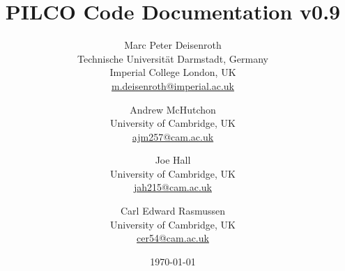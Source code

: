 \newcommand{\te}[1]{\text{#1}}
\newcommand{\dpp}{\mathrm{\partial}}
\newcommand{\pdiff}[2]{\frac{\dpp #1}{\dpp #2}}

\setcounter{secnumdepth}{3}

\title{\bf PILCO Code Documentation v0.9} 

\author{Marc Peter Deisenroth\\
Technische Universit\"at Darmstadt, Germany\\
Imperial College London, UK\\
\url{m.deisenroth@imperial.ac.uk}
 \and 
Andrew McHutchon\\
University of Cambridge, UK \\
\url{ajm257@cam.ac.uk}
\and 
Joe Hall\\
University of Cambridge, UK\\
\url{jah215@cam.ac.uk}
\and
 Carl Edward Rasmussen\\
University of Cambridge, UK\\
\url{cer54@cam.ac.uk}
}

\date{\today}

